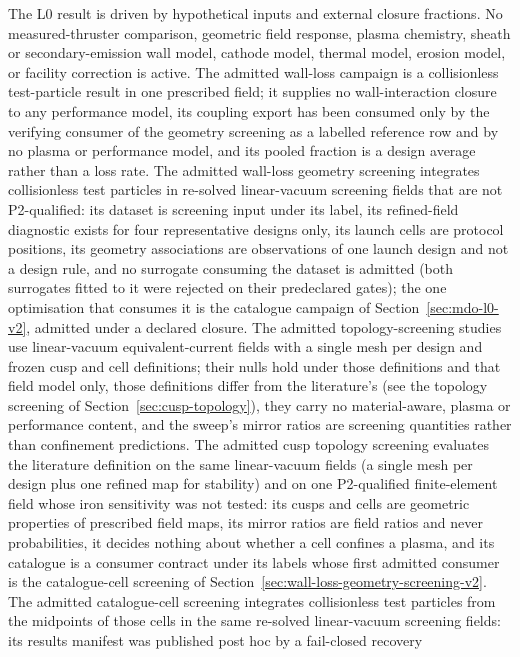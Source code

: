 \documentclass[11pt]{article}
\begin{document}
The L0 result is driven by hypothetical inputs and external closure
fractions. No measured-thruster comparison, geometric field response, plasma
chemistry, sheath or secondary-emission wall model, cathode model, thermal
model, erosion model, or facility correction is active. The admitted wall-loss
campaign is a collisionless test-particle result in one prescribed field; it
supplies no wall-interaction closure to any performance model, its coupling
export has been consumed only by the verifying consumer of the geometry
screening as a labelled reference row and by no plasma or performance model,
and its pooled fraction is a design average rather than a loss rate. The
admitted wall-loss geometry screening integrates collisionless test particles
in re-solved linear-vacuum screening fields that are not P2-qualified: its
dataset is screening input under its label, its refined-field diagnostic exists
for four representative designs only, its launch cells are protocol positions,
its geometry associations are observations of one launch design and not a
design rule, and no surrogate consuming the dataset is admitted (both surrogates
fitted to it were rejected on their predeclared gates); the one optimisation that
consumes it is the catalogue campaign of Section~\ref{sec:mdo-l0-v2}, admitted
under a declared closure. The admitted topology-screening studies use
linear-vacuum equivalent-current fields with a single mesh per design and
frozen cusp and cell definitions; their nulls hold under those definitions and
that field model only, those definitions differ from the literature's (see the
topology screening of Section~\ref{sec:cusp-topology}), they carry no
material-aware, plasma or performance content, and the sweep's mirror ratios
are screening quantities rather than confinement predictions. The admitted
cusp topology screening evaluates the literature definition on the same
linear-vacuum fields (a single mesh per design plus one refined map for
stability) and on one P2-qualified finite-element field whose iron sensitivity
was not tested: its cusps and cells are geometric properties of prescribed
field maps, its mirror ratios are field ratios and never probabilities, it
decides nothing about whether a cell confines a plasma, and its catalogue is a
consumer contract under its labels whose first admitted consumer is the
catalogue-cell screening of Section~\ref{sec:wall-loss-geometry-screening-v2}.
The admitted catalogue-cell screening integrates collisionless test particles
from the midpoints of those cells in the same re-solved linear-vacuum screening
fields: its results manifest was published post hoc by a fail-closed recovery
\end{document}
